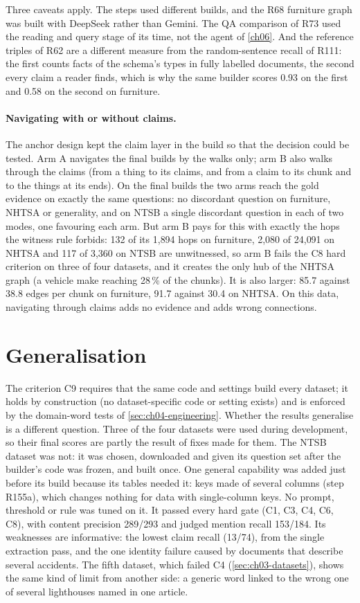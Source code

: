 Three caveats apply. The steps used different builds, and the R68 furniture graph was built with DeepSeek rather
than Gemini. The QA comparison of R73 used the reading and query stage of its time, not the agent of \cref{ch06}.
And the reference triples of R62 are a different measure from the random-sentence recall of R111: the first counts
facts of the schema's types in fully labelled documents, the second every claim a reader finds, which is why the
same builder scores 0.93 on the first and 0.58 on the second on furniture.

\paragraph{Navigating with or without claims.} The anchor design kept the claim layer in the build so that the
decision could be tested. Arm A navigates the final builds by the walks only; arm B also walks through the claims
(from a thing to its claims, and from a claim to its chunk and to the things at its ends). On the final builds the
two arms reach the gold evidence on exactly the same questions: no discordant question on furniture, NHTSA or
generality, and on NTSB a single discordant question in each of two modes, one favouring each arm. But arm B pays for this with exactly the hops the witness rule forbids:
132 of its 1{,}894 hops on furniture, 2{,}080 of 24{,}091 on NHTSA and 117 of 3{,}360 on NTSB are unwitnessed, so arm
B fails the C8 hard criterion on three of four datasets, and it creates the only hub of the NHTSA graph (a vehicle
make reaching 28\,\% of the chunks). It is also larger: 85.7 against 38.8 edges per chunk on furniture, 91.7 against
30.4 on NHTSA. On this data, navigating through claims adds no evidence and adds wrong connections.

\section{Generalisation}\label{sec:ch05-generalisation}

The criterion C9 requires that the same code and settings build every dataset; it holds by construction (no
dataset-specific code or setting exists) and is enforced by the domain-word tests of \cref{sec:ch04-engineering}.
Whether the results generalise is a different question. Three of the four datasets were used during development,
so their final scores are partly the result of fixes made for them. The NTSB dataset was not: it was chosen,
downloaded and given its question set after the builder's code was frozen, and built once. One general
capability was added just before its build because its tables needed it: keys made of several columns (step
R155a), which changes nothing for data with single-column keys. No prompt, threshold or rule was tuned on it. It passed every hard gate
(C1, C3, C4, C6, C8), with content precision 289/293 and judged mention recall 153/184. Its weaknesses are
informative: the lowest claim recall (13/74), from the single extraction pass, and the one identity failure caused
by documents that describe several accidents. The fifth dataset, which failed C4 (\cref{sec:ch03-datasets}), shows
the same kind of limit from another side: a generic word linked to the wrong one of several lighthouses named in
one article.

